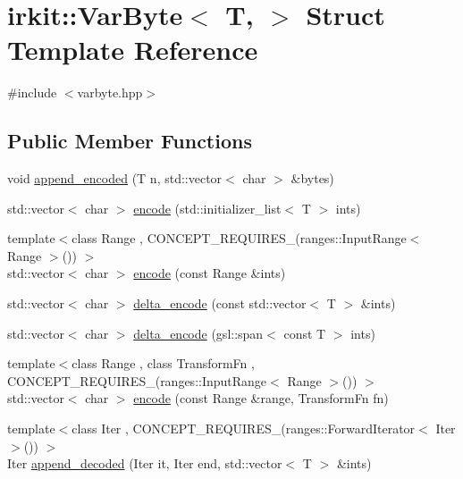 \hypertarget{structirkit_1_1VarByte}{}\section{irkit\+:\+:Var\+Byte$<$ T, $>$ Struct Template Reference}
\label{structirkit_1_1VarByte}


{\ttfamily \#include $<$varbyte.\+hpp$>$}

\subsection*{Public Member Functions}
\begin{DoxyCompactItemize}
\item 
void \mbox{\hyperlink{structirkit_1_1VarByte_aa5418ece5dab50514de2825be2fda530}{append\+\_\+encoded}} (T n, std\+::vector$<$ char $>$ \&bytes)
\item 
std\+::vector$<$ char $>$ \mbox{\hyperlink{structirkit_1_1VarByte_af69d2829dce3a298b40cd34c24841b06}{encode}} (std\+::initializer\+\_\+list$<$ T $>$ ints)
\item 
{\footnotesize template$<$class Range , C\+O\+N\+C\+E\+P\+T\+\_\+\+R\+E\+Q\+U\+I\+R\+E\+S\+\_\+(ranges\+::\+Input\+Range$<$ Range $>$()) $>$ }\\std\+::vector$<$ char $>$ \mbox{\hyperlink{structirkit_1_1VarByte_ad886dac4e4765bf7c581f42629419610}{encode}} (const Range \&ints)
\item 
std\+::vector$<$ char $>$ \mbox{\hyperlink{structirkit_1_1VarByte_a0182cbcb0c80705b7effe6cb2dc7cd6b}{delta\+\_\+encode}} (const std\+::vector$<$ T $>$ \&ints)
\item 
std\+::vector$<$ char $>$ \mbox{\hyperlink{structirkit_1_1VarByte_a71209f4e71eee7af72209058d17334fa}{delta\+\_\+encode}} (gsl\+::span$<$ const T $>$ ints)
\item 
{\footnotesize template$<$class Range , class Transform\+Fn , C\+O\+N\+C\+E\+P\+T\+\_\+\+R\+E\+Q\+U\+I\+R\+E\+S\+\_\+(ranges\+::\+Input\+Range$<$ Range $>$()) $>$ }\\std\+::vector$<$ char $>$ \mbox{\hyperlink{structirkit_1_1VarByte_a9125fe467a53a0556bd642c09d5d2d27}{encode}} (const Range \&range, Transform\+Fn fn)
\item 
{\footnotesize template$<$class Iter , C\+O\+N\+C\+E\+P\+T\+\_\+\+R\+E\+Q\+U\+I\+R\+E\+S\+\_\+(ranges\+::\+Forward\+Iterator$<$ Iter $>$()) $>$ }\\Iter \mbox{\hyperlink{structirkit_1_1VarByte_a6f71f45fca0f585b4d7c0a704c214f81}{append\+\_\+decoded}} (Iter it, Iter end, std\+::vector$<$ T $>$ \&ints)

\end{DoxyCompactItemize}
